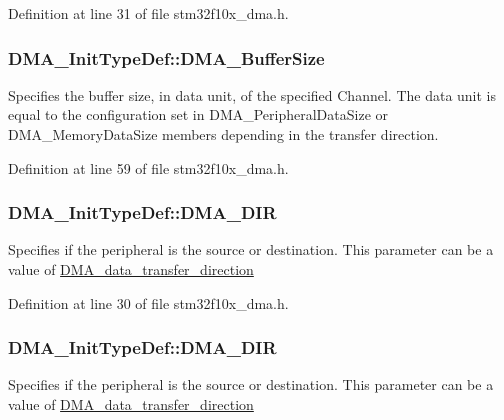 Definition at line 31 of file stm32f10x\+\_\+dma.\+h.

\subsubsection[{\texorpdfstring{D\+M\+A\+\_\+\+Buffer\+Size}{DMA_BufferSize}}]{ D\+M\+A\+\_\+\+Init\+Type\+Def\+::\+D\+M\+A\+\_\+\+Buffer\+Size}\hypertarget{struct_d_m_a___init_type_def_a999df57215b28b3b1b3b6836c4952ca5}{}\label{struct_d_m_a___init_type_def_a999df57215b28b3b1b3b6836c4952ca5}
Specifies the buffer size, in data unit, of the specified Channel. The data unit is equal to the configuration set in D\+M\+A\+\_\+\+Peripheral\+Data\+Size or D\+M\+A\+\_\+\+Memory\+Data\+Size members depending in the transfer direction. 

Definition at line 59 of file stm32f10x\+\_\+dma.\+h.

\subsubsection[{\texorpdfstring{D\+M\+A\+\_\+\+D\+IR}{DMA_DIR}}]{ D\+M\+A\+\_\+\+Init\+Type\+Def\+::\+D\+M\+A\+\_\+\+D\+IR}\hypertarget{struct_d_m_a___init_type_def_ac4f02c3e52ba64d558678dd22df044cd}{}\label{struct_d_m_a___init_type_def_ac4f02c3e52ba64d558678dd22df044cd}
Specifies if the peripheral is the source or destination. This parameter can be a value of \hyperlink{group___d_m_a__data__transfer__direction}{D\+M\+A\+\_\+data\+\_\+transfer\+\_\+direction} 

Definition at line 30 of file stm32f10x\+\_\+dma.\+h.

\subsubsection[{\texorpdfstring{D\+M\+A\+\_\+\+D\+IR}{DMA_DIR}}]{ D\+M\+A\+\_\+\+Init\+Type\+Def\+::\+D\+M\+A\+\_\+\+D\+IR}\hypertarget{struct_d_m_a___init_type_def_a91b47435ccf4a40efa97bbbe631789e1}{}\label{struct_d_m_a___init_type_def_a91b47435ccf4a40efa97bbbe631789e1}
Specifies if the peripheral is the source or destination. This parameter can be a value of \hyperlink{group___d_m_a__data__transfer__direction}{D\+M\+A\+\_\+data\+\_\+transfer\+\_\+direction} 

